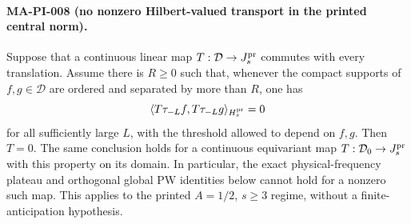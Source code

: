 \paragraph{MA-PI-008 (no nonzero Hilbert-valued transport in the printed central norm).}
Suppose that a continuous linear map
\(T:\mathcal D\to J_s^{\rm pr}\) commutes with every translation.
Assume there is \(R\ge0\) such that, whenever the compact
supports of \(f,g\in\mathcal D\) are ordered and separated by
more than \(R\), one has
\[
       \langle T\tau_{-L}f,T\tau_{-L}g\rangle_{H_s^{\rm pr}}=0
\]
for all sufficiently large \(L\), with the threshold allowed
to depend on \(f,g\). Then \(T=0\).
The same conclusion holds for a continuous equivariant map
\(T:\mathcal D_0\to J_s^{\rm pr}\) with this property on its
domain. In particular, the exact physical-frequency plateau
and orthogonal global PW identities below cannot hold for a
nonzero such map. This applies to the printed \(A=1/2\),
\(s\ge3\) regime, without a finite-anticipation hypothesis.

